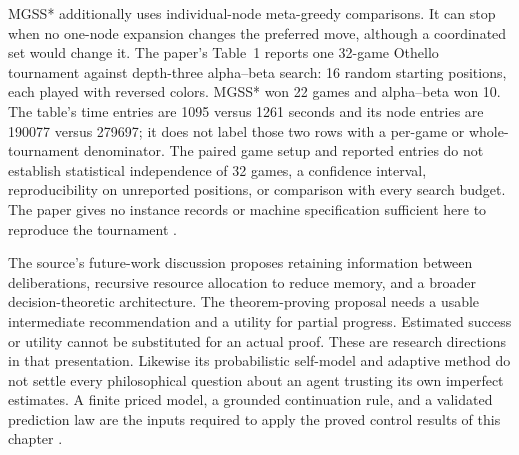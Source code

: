 MGSS* additionally uses individual-node meta-greedy comparisons.
It can stop when no one-node expansion changes the preferred move,
although a coordinated set would change it. The paper's Table~1 reports one
32-game Othello tournament against depth-three alpha--beta search:
16 random starting positions, each played with reversed colors.
MGSS* won 22 games and alpha--beta won 10. The table's time entries
are 1095 versus 1261 seconds and its node entries are 190077 versus
279697; it does not label those two rows with a per-game or whole-tournament
denominator. The paired game setup and reported entries do not establish statistical
independence of 32 games, a confidence interval, reproducibility on
unreported positions, or comparison with every search budget. The paper
gives no instance records or machine specification sufficient here to
reproduce the tournament \cite[\S5, pp.~408--410]{RussellWefald1989KRMetareasoning}.

The source's future-work discussion proposes retaining information
between deliberations, recursive resource allocation to reduce memory,
and a broader decision-theoretic architecture. The theorem-proving
proposal needs a usable intermediate recommendation and a utility for
partial progress. Estimated success or utility cannot be substituted
for an actual proof. These are research directions in that presentation.
Likewise its probabilistic self-model and adaptive method do not settle
every philosophical question about an agent trusting its own imperfect
estimates. A finite priced model, a grounded continuation rule, and a
validated prediction law are the inputs required to apply the proved
control results of this chapter
\cite[\S\S4.5, 6--7, pp.~407--411]{RussellWefald1989KRMetareasoning}.

